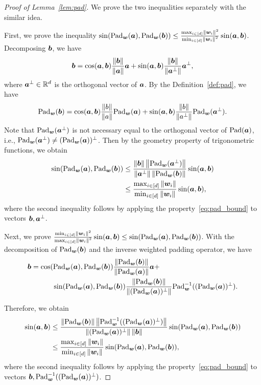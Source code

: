 \documentclass[lettersize,onecolumn,journal]{IEEEtran}
\theoremstyle{definition}
\theoremstyle{definition}
\begin{document}
\begin{proof}[Proof of Lemma~\ref{lem:pad}] We prove the two inequalities separately with the similar idea.

First, we prove the inequality $\sin(\text{Pad}_{\bm{w}}(\bm{a}),  \text{Pad}_{\bm{w}}(\bm{b})) \leq \frac{ \max_{i \in [d]} \left\lVert\bm{w}_i\right\rVert^2 }{\min_{i \in [d]} \left\lVert\bm{w}_i\right\rVert^2} \sin (\bm{a}, \bm{b})$. Decomposing $\bm{b}$, we have
\begin{equation}
    \bm{b} = \cos (\bm{a}, \bm{b}) \frac{\left\lVert\bm{b}\right\rVert}{\left\lVert\bm{a}\right\rVert} \bm{a} + \sin (\bm{a}, \bm{b}) \frac{\left\lVert\bm{b}\right\rVert}{\left\lVert\bm{a}^{\perp}\right\rVert}\bm{a}^{\perp},
\end{equation}
where $\bm{a}^{\perp} \in \mathbb{R}^d$ is the orthogonal vector of $\bm{a}$. By the Definition~\ref{def:pad}, we have 
\begin{equation}\label{eq:pad_second_ineq}
    \pad_{\mw}(\mb) = \cos (\ma, \mb) \frac{\onorm{b}}{\onorm{a}} \pad_{\mw}(\ma) + \sin (\ma, \mb) \frac{\onorm{b}}{\onorm{a^{\perp}}} \pad_{\mw}(\ma^{\perp}).
\end{equation}
Note that $\text{Pad}_{\bm{w}}(\bm{a}^{\perp})$ is not necessary equal to the orthogonal vector of $\text{Pad}(\bm{a})$, i.e., $\text{Pad}_{\bm{w}}(\bm{a}^{\perp}) \neq (\text{Pad}_{\bm{w}}(\bm{a}))^{\perp}$. Then by the geometry property of trigonometric functions, we obtain
\begin{align}
    \sin(\text{Pad}_{\bm{w}}(\bm{a}),  \text{Pad}_{\bm{w}}(\bm{b}))  &\leq \frac{  \left\lVert\bm{b}\right\rVert \left\lVert\text{Pad}_{\bm{w}}(\bm{a}^{\perp})\right\rVert }{ \left\lVert\bm{a}^{\perp}\right\rVert \left\lVert \text{Pad}_{\bm{w}}(\bm{b})\right\rVert} \sin (\bm{a}, \bm{b})  \\
    & \leq  \frac{ \max_{i \in [d]} \left\lVert\bm{w}_i\right\rVert }{\min_{i \in [d]} \left\lVert\bm{w}_i\right\rVert} \sin (\bm{a}, \bm{b}),
\end{align}
where the second inequality follows by applying the property~\eqref{eq:pad_bound} to vectors $\bm{b}, \bm{a}^{\perp}$. 

Next, we prove $\frac{\min_{i \in [d]} \left\lVert\bm{w}_i\right\rVert^2}{\max_{i \in [d]} \left\lVert\bm{w}_i\right\rVert^2 } \sin (\bm{a}, \bm{b}) \leq \sin(\text{Pad}_{\bm{w}}(\bm{a}),  \text{Pad}_{\bm{w}}(\bm{b}))$. With the decomposition of $\text{Pad}_{\bm{w}}(\bm{b})$ and the inverse weighted padding operator, we have 
\begin{align}
    \bm{b} &=  \cos(\text{Pad}_{\bm{w}}(\bm{a}), \text{Pad}_{\bm{w}}(\bm{b})) \frac{\left\lVert\text{Pad}_{\bm{w}}(\bm{b})\right\rVert}{\left\lVert\text{Pad}_{\bm{w}}(\bm{a})\right\rVert} \bm{a} +\\
    & \quad \quad \quad \sin(\text{Pad}_{\bm{w}}(\bm{a}), \text{Pad}_{\bm{w}}(\bm{b}))\frac{\left\lVert\text{Pad}_{\bm{w}}(\bm{b})\right\rVert}{\left\lVert(\text{Pad}_{\bm{w}}(\bm{a}))^{\perp}\right\rVert} \text{Pad}_{\bm{w}}^{-1}((\text{Pad}_{\bm{w}}(\bm{a}))^{\perp}).
\end{align}

Therefore, we obtain 
\begin{align}
    \sin(\bm{a}, \bm{b}) &\leq \frac{ \left\lVert\text{Pad}_{\bm{w}}(\bm{b}) \right\rVert \left\lVert\text{Pad}_{\bm{w}}^{-1}((\text{Pad}_{\bm{w}}(\bm{a}))^{\perp})  \right\rVert }{ \left\lVert(\text{Pad}_{\bm{w}}(\bm{a}))^{\perp} \right\rVert \left\lVert\bm{b}\right\rVert }  \sin(\text{Pad}_{\bm{w}}(\bm{a}), \text{Pad}_{\bm{w}}(\bm{b}))\\
    & \leq \frac{ \max_{i \in [d]} \left\lVert\bm{w}_i\right\rVert }{\min_{i \in [d]} \left\lVert\bm{w}_i\right\rVert} \sin(\text{Pad}_{\bm{w}}(\bm{a}), \text{Pad}_{\bm{w}}(\bm{b})),
\end{align}
where the second inequality follows by applying the property~\eqref{eq:pad_bound} to vectors $\bm{b}, \text{Pad}_{\bm{w}}^{-1}((\text{Pad}_{\bm{w}}(\bm{a}))^{\perp})$.


\end{proof}
\end{document}

